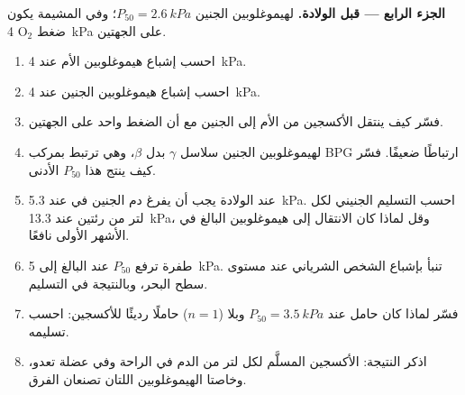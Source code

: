 \begin{problem}
\medskip
\noindent\textbf{الجزء الرابع --- قبل الولادة.}
لهيموغلوبين الجنين $P_{50} = \qty{2.6}{kPa}$؛ وفي المشيمة يكون ضغط
$\mathrm{O_2}$ \qty{4}{kPa} على الجهتين.
\begin{enumerate}[resume]
  \item احسب إشباع هيموغلوبين الأم عند \qty{4}{kPa}.
  \item احسب إشباع هيموغلوبين الجنين عند \qty{4}{kPa}.
  \item فسّر كيف ينتقل الأكسجين من الأم إلى الجنين مع أن الضغط واحد
        على الجهتين.
  \item لهيموغلوبين الجنين سلاسل $\gamma$ بدل $\beta$، وهي ترتبط
        بمركب BPG ارتباطًا ضعيفًا. فسّر كيف ينتج هذا $P_{50}$ الأدنى.
  \item عند الولادة يجب أن يفرغ دم الجنين في  عند
        \qty{5.3}{kPa}. احسب التسليم الجنيني لكل لتر من رئتين عند
        \qty{13.3}{kPa}، وقل لماذا كان الانتقال إلى هيموغلوبين البالغ
        في الأشهر الأولى نافعًا.
  \item طفرة ترفع $P_{50}$ عند البالغ إلى \qty{5}{kPa}. تنبأ بإشباع
        الشخص الشرياني عند مستوى سطح البحر، وبالنتيجة في التسليم.
  \item فسّر لماذا كان حامل عند $P_{50} = \qty{3.5}{kPa}$ وبلا 
        ($n = 1$) حاملًا رديئًا للأكسجين: احسب تسليمه.
  \item اذكر النتيجة: الأكسجين المسلَّم لكل لتر من الدم في الراحة وفي
        عضلة تعدو، وخاصتا الهيموغلوبين اللتان تصنعان الفرق.
\end{enumerate}
\end{problem}
